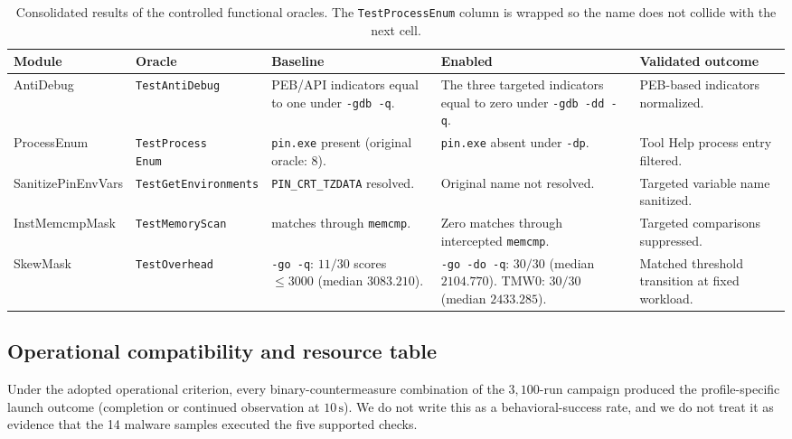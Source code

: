 \documentclass[pdflatex,sn-mathphys-num]{sn-jnl}
\theoremstyle{thmstyleone}
\theoremstyle{thmstyletwo}
\theoremstyle{thmstylethree}
\begin{document}
\begin{table}[t]
\caption{Consolidated results of the controlled functional oracles. The \texttt{TestProcessEnum} column is wrapped so the name does not collide with the next cell.}
\label{tab:oracle_consolidated}
\centering
\small
\setlength{\tabcolsep}{4pt}
\begin{tabularx}{\textwidth}{@{}
>{\raggedright\arraybackslash}p{}
>{\raggedright\arraybackslash}p{}
>{\raggedright\arraybackslash}X
>{\raggedright\arraybackslash}X
>{\raggedright\arraybackslash}p{}
@{}}
\toprule
\textbf{Module} & \textbf{Oracle} & \textbf{Baseline} & \textbf{Enabled} & \textbf{Validated outcome} \\
\midrule
AntiDebug & \texttt{TestAntiDebug} &
PEB/API indicators equal to one under \texttt{-gdb -q}. &
The three targeted indicators equal to zero under \texttt{-gdb -dd -q}. &
PEB-based indicators normalized. \\
\addlinespace
ProcessEnum & \shortstack[l]{\texttt{TestProcess}\\\texttt{Enum}} &
\texttt{pin.exe} present (original oracle: 8). &
\texttt{pin.exe} absent under \texttt{-dp}. &
Tool Help process entry filtered. \\
\addlinespace
SanitizePinEnvVars & \texttt{TestGetEnvironments} &
\texttt{PIN\_CRT\_TZDATA} resolved. &
Original name not resolved. &
Targeted variable name sanitized. \\
\addlinespace
InstMemcmpMask & \texttt{TestMemoryScan} &
255 matches through \texttt{memcmp}. &
Zero matches through intercepted \texttt{memcmp}. &
Targeted comparisons suppressed. \\
\addlinespace
SkewMask & \texttt{TestOverhead} &
\texttt{-go -q}: $11/30$ scores $\le 3000$ (median $3083.210$). &
\texttt{-go -do -q}: $30/30$ (median $2104.770$). TMW0: $30/30$ (median $2433.285$). &
Matched threshold transition at fixed workload. \\
\bottomrule
\end{tabularx}
\end{table}

\subsection{Operational compatibility and resource table}
\label{subsec:operational}

Under the adopted operational criterion, every binary-countermeasure combination of the $3{,}100$-run campaign produced the profile-specific launch outcome (completion or continued observation at $10\,\mathrm{s}$). We do not write this as a behavioral-success rate, and we do not treat it as evidence that the 14 malware samples executed the five supported checks.
\end{document}
